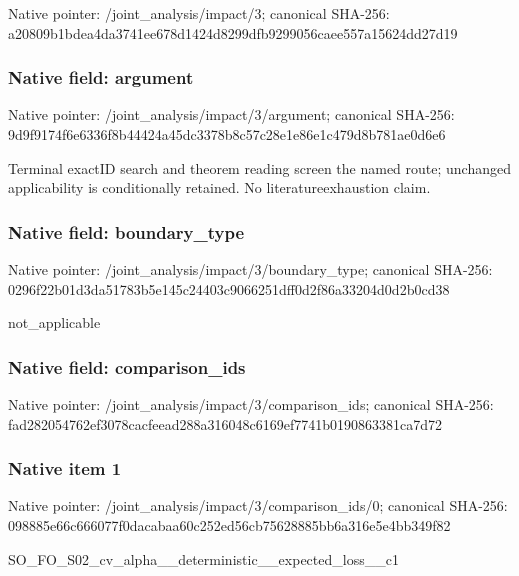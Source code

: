 \documentclass[10pt,a4paper]{article}
\begin{document}
Native pointer: /joint\_analysis/impact/3; canonical SHA-256: a20809b1bdea4da3741ee678\allowbreak{}d1424d8299dfb9299056caee\allowbreak{}557a15624dd27d19



\subsubsection{Native field: argument}


Native pointer: /joint\_analysis/impact/3/argument; canonical SHA-256: 9d9f9174f6e6336f8b44424a\allowbreak{}45dc3378b8c57c28e1e86e1c\allowbreak{}479d8b781ae0d6e6


Terminal exactID search and theorem reading screen the named route; unchanged applicability is conditionally retained. No literatureexhaustion claim.


\subsubsection{Native field: boundary\_type}


Native pointer: /joint\_analysis/impact/3/boundary\_type; canonical SHA-256: 0296f22b01d3da51783b5e14\allowbreak{}5c24403c9066251dff0d2f86\allowbreak{}a33204d0d2b0cd38


not\_applicable


\subsubsection{Native field: comparison\_ids}


Native pointer: /joint\_analysis/impact/3/comparison\_ids; canonical SHA-256: fad282054762ef3078cacfee\allowbreak{}ad288a316048c6169ef7741b\allowbreak{}0190863381ca7d72



\subsubsection{Native item 1}


Native pointer: /joint\_analysis/impact/3\allowbreak{}/comparison\_ids/0; canonical SHA-256: 098885e66c666077f0dacaba\allowbreak{}a60c252ed56cb75628885bb6\allowbreak{}a316e5e4bb349f82


SO\_FO\_S02\_cv\_alpha\_\_dete\allowbreak{}rministic\_\_expected\_loss\allowbreak{}\_\_c1
\end{document}
